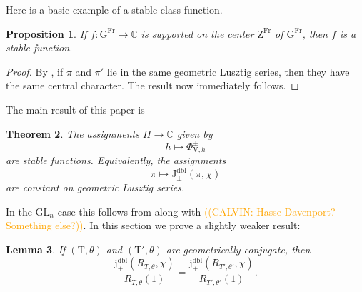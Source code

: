 \documentclass[12pt, reqno]{amsart}
\newtheorem{theorem}{Theorem}[section]
\newtheorem{proposition}[theorem]{Proposition}
\newtheorem{lemma}[theorem]{Lemma}
\theoremstyle{definition}
\theoremstyle{definition}
\theoremstyle{definition}
\newcommand{\cComplex}{\mathbb{C}}
\newcommand{\hermitianSpace}{\mathrm{V}}
\newcommand{\GL}{\mathrm{GL}}
\newcommand{\finiteField}{\mathbb{F}}
\newcommand{\Frobenius}{\operatorname{Fr}}
\newcommand{\genHermitianJacobiKernel}[2]{\Phi^{\pm}_{#1,#2}}
\newcommand{\dblJacobiSumScalar}[2]{\mathrm{J}_{\pm}^{\mathrm{dbl}}\left(#1, #2\right)}
\newcommand{\dblVirtualJacobiSumScalar}[2]{\mathrm{j}_{\pm}^{\mathrm{dbl}}\left(#1, #2\right)}
\newcommand{\algebraicGroup}[1]{\boldsymbol{\mathrm{#1}}}
\newcommand{\calvin}[1]{\textcolor{orange}{\sffamily ((CALVIN: #1))}}
\begin{document}
Here is a basic example of a stable class function.
\begin{proposition}
\label{prop:central_char}
    If $f \colon \algebraicGroup{G}^{\Frobenius} \to \cComplex$ is supported on the center $\algebraicGroup{Z}^{\Frobenius}$ of $\algebraicGroup{G}^{\Frobenius}$, then $f$ is a stable function.
\end{proposition}
\begin{proof}
By \cite[Lemma 2.2]{Malle2007}, if $\pi$ and $\pi'$ lie in the same geometric Lusztig series, then they have the same central character. The result now immediately follows.
\end{proof}
\begin{comment}
\begin{proof}
The Deligne Lusztig variety is a subset of the group, for any $z \in \algebraicGroup{Z}(\finiteField)$ we can move the action of $z \in algebraicGroup{G}(\finiteField)$ to the action of $z \in \algebraicGroup{T}(\finiteField)$
Thus it suffices to show that $\theta|_{\algebraicGroup{Z}(\finiteField))} = \theta'|_{\algebraicGroup{Z}(\finiteField)}$
But this follows from geometric conjugacy: for large enough $n$, $\theta \circ \fieldNorm{n}{1}|_{\algebraicGroup{Z}(\finiteField))} = \theta'\circ \fieldNorm{n}{1}|_{\algebraicGroup{Z}(\finiteField)}$
and the Norm map is surjective.
\end{proof}
\end{comment}


The main result of this paper is 
\begin{theorem}
\label{thm:Phi_stable}
	The assignments $H \to \cComplex$ given by $$h \mapsto \genHermitianJacobiKernel{\hermitianSpace}{h}$$ are stable functions. Equivalently, the assignments $$\pi \mapsto \dblJacobiSumScalar{\pi}{\chi}$$ are constant on geometric Lusztig series.
\end{theorem}
In the $\GL_n$ case this follows from  along with \calvin{Hasse-Davenport? Something else?}.
In this section we prove a slightly weaker result:

\begin{lemma}
\label{lem:indep_geo_conj}
    If $(\algebraicGroup{T},\theta)$ and $(\algebraicGroup{T}', \theta)$ are geometrically conjugate, then $$\frac{\dblVirtualJacobiSumScalar{R_{T, \theta}}{\chi}}{R_{T,\theta}(1)} = \frac{\dblVirtualJacobiSumScalar{R_{T', \theta'}}{\chi}}{R_{T',\theta'}(1)}.$$
\end{lemma}
\end{document}
